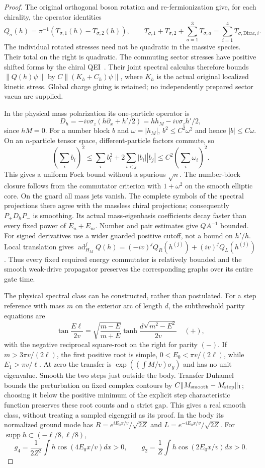 \begin{proof}
The original orthogonal boson rotation and re-fermionization give,
for each chirality, the operator identities
\[
 Q_\sigma(h)=\pi^{-1}(T_{\sigma,1}(h)-T_{\sigma,2}(h)),\qquad
 T_{\sigma,1}+T_{\sigma,2}+\sum_{a=1}^3T_{\sigma,a}
      =\sum_{i=1}^4T_{\sigma,\mathrm{Dirac},i}.
\]
The individual rotated stresses need not be quadratic in the
massive species. Their total on the right is quadratic.
The commuting sector stresses have positive shifted forms by
the chiral QEI~\cite[Theorem~4.1 and Remarks~2--3]{FewsterHollands2005}.
Their joint spectral calculus therefore bounds $\|Q(h)\psi\|$
by $C\|(K_h+C_h)\psi\|$, where $K_h$ is the actual original
localized kinetic stress. Global charge gluing is retained;
no independently prepared sector vacua are supplied.

In the physical mass polarization its one-particle operator is
\[
 D_h=-iv\sigma_z(h\partial_x+h'/2)
     =h h_M-iv\sigma_z h'/2,
\]
since $hM=0$. For a number block $b$ and $\omega=|h_M|$,
$b^2\le C^2\omega^2$ and hence $|b|\le C\omega$.
On an $n$-particle tensor space, different-particle factors
commute, so
\[
 (\sum_i b_i)^2\le\sum_i b_i^2+
     2\sum_{i<j}|b_i||b_j|
       \le C^2(\sum_i\omega_i)^2.
\]
This gives a uniform Fock bound without a spurious $\sqrt n$.
The number-block closure follows from the commutator criterion
with $1+\omega^2$ on the smooth elliptic core. On the guard all
mass jets vanish. The complete symbols of the spectral projections
there agree with the massless chiral projections; consequently
$P_+D_hP_-$ is smoothing. Its actual mass-eigenbasis coefficients
decay faster than every fixed power of $E_n+E_m$.
Number and pair estimates give $QA^{-1}$ bounded.
For signed derivatives use a wider guarded positive cutoff,
not a bound on $h'/h$.
Local translation gives
$\operatorname{ad}_{H_M}^jQ(h)=(-iv)^jQ_R(h^{(j)})+
(iv)^jQ_L(h^{(j)})$.
Thus every fixed required energy commutator is relatively bounded
and the smooth weak-drive propagator preserves the corresponding
graphs over its entire gate time.

The physical spectral class can be constructed, rather than
postulated. For a step reference with mass $m$ on the exterior
arc of length $d$, the subthreshold parity equations are
\[
 \tan\frac{E\ell}{2v}
 =\sqrt{\frac{m-E}{m+E}}\tanh\frac{d\sqrt{m^2-E^2}}{2v}
 \quad(+),
\]
with the negative reciprocal square-root on the right for parity
$(-)$. If $m>3\pi v/(2\ell)$, the first positive root is simple,
$0<E_0<\pi v/(2\ell)$, while $E_1>\pi v/\ell$.
At zero the transfer is $\exp((\int M/v)\sigma_y)$ and has no
unit eigenvalue. Smooth the two steps just outside the body.
Transfer Duhamel bounds the perturbation on fixed complex contours
by $C\|M_{\rm smooth}-M_{\rm step}\|_1$; choosing it below the
positive minimum of the explicit step characteristic function
preserves these root counts and a strict gap. This gives a real
smooth class, without treating a sampled eigengrid as its proof.
In the body its normalized ground mode has
$R=e^{iE_0x/v}/\sqrt{2Z}$ and $L=e^{-iE_0x/v}/\sqrt{2Z}$.
For $\operatorname{supp}h\subset(-\ell/8,\ell/8)$,
\[
 g_4=\frac1{2Z^2}\int h\cos(4E_0x/v)dx>0,
 \qquad g_2=\frac1Z\int h\cos(2E_0x/v)dx>0.
\]


\end{proof}

